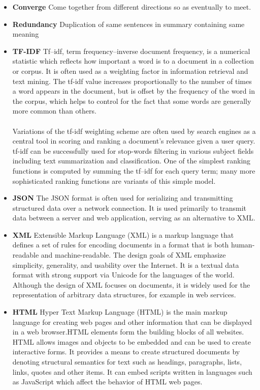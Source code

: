 \begin{itemize}
\item \textbf{Converge} \newline
Come together from different directions so as eventually to meet.

\item \textbf{Redundancy} \newline
Duplication of same sentences in summary containing same meaning
\item \textbf{TF-IDF} \newline
Tf–idf, term frequency–inverse document frequency, is a numerical statistic which reflects how important a word is to a document in a collection or corpus. It is often used as a weighting factor in information retrieval and text mining. The tf-idf value increases proportionally to the number of times a word appears in the document, but is offset by the frequency of the word in the corpus, which helps to control for the fact that some words are generally more common than others.
\paragraph{} Variations of the tf-idf weighting scheme are often used by search engines as a central tool in scoring and ranking a document's relevance given a user query. tf-idf can be successfully used for stop-words filtering in various subject fields including text summarization and classification. One of the simplest ranking functions is computed by summing the tf–idf for each query term; many more sophisticated ranking functions are variants of this simple model.

\item \textbf{JSON} \newline
The JSON format is often used for serializing and transmitting structured data over a network connection. It is used primarily to transmit data between a server and web application, serving as an alternative to XML.
\item \textbf{XML} \newline
Extensible Markup Language (XML) is a markup language that defines a set of rules for encoding documents in a format that is both human-readable  and machine-readable. The design goals of XML emphasize simplicity, generality, and usability over the Internet.  It is a textual data format with strong support via Unicode for the languages of the world. Although the design of XML focuses on documents, it is widely used for the representation of arbitrary data structures, for example in web services. 
\item \textbf{HTML} \newline
Hyper Text Markup Language (HTML) is the main markup language for creating web pages and other information that can be displayed in a web browser.HTML elements form the building blocks of all websites. HTML allows images and objects  to be embedded and can be used to create interactive forms. It provides a means to create structured documents by denoting structural semantics for text such as headings, paragraphs, lists, links, quotes and other items. It can embed scripts written in languages such as JavaScript which affect the behavior of HTML web pages.


\end{itemize}
